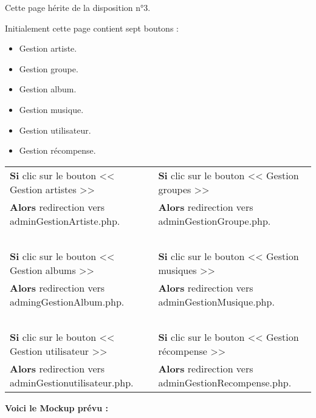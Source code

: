 			\begin{paragraphe}
				Cette page hérite de la disposition n°3. \par
				Initialement cette page contient sept boutons :
				\begin{itemize}
					\item Gestion artiste.
					\item Gestion groupe.
					\item Gestion album.
					\item Gestion musique.
					\item Gestion utilisateur.
                    \item Gestion récompense.
				\end{itemize}
			\end{paragraphe}

            \begin{center}
                \begin{tabular}{l | l}
                    \textbf{Si} clic sur le bouton << Gestion artistes >> & \textbf{Si} clic sur le bouton << Gestion groupes >> \\
                    \textbf{Alors} redirection vers adminGestionArtiste.php. & \textbf{Alors} redirection vers adminGestionGroupe.php. \\ \\
                    
                    \textbf{Si} clic sur le bouton << Gestion albums >> & \textbf{Si} clic sur le bouton << Gestion musiques >> \\
                    \textbf{Alors} redirection vers admingGestionAlbum.php. & \textbf{Alors} redirection vers adminGestionMusique.php. \\ \\
                    
                    \textbf{Si} clic sur le bouton << Gestion utilisateur >> & \textbf{Si} clic sur le bouton << Gestion récompense >> \\
                    \textbf{Alors} redirection vers adminGestionutilisateur.php. & \textbf{Alors} redirection vers adminGestionRecompense.php.
                \end{tabular}
            \end{center}

        \clearpage

            \begin{paragraphe}
                \textbf{Voici le Mockup prévu :}
            \end{paragraphe}

